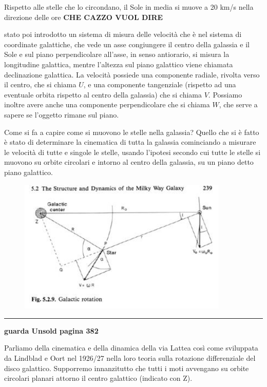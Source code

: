 Rispetto alle stelle che lo circondano, il Sole in media si muove a 20 km/s nella direzione delle ore \textbf{CHE CAZZO VUOL DIRE}

\E stato poi introdotto un sistema di misura delle velocità che è nel sistema di coordinate galattiche, che vede un asse congiungere il centro della galassia e il Sole e sul piano perpendicolare all'asse, in senso antiorario, si misura la longitudine galattica, mentre l'altezza sul piano galattico viene chiamata declinazione galattica. La velocità possiede una componente radiale, rivolta verso il centro, che si chiama $U$, e una componente tangenziale (rispetto ad una eventuale orbita rispetto al centro della galassia) che si chiama $V$. Possiamo inoltre avere anche una componente perpendicolare che si chiama $W$, che serve a sapere se l'oggetto rimane sul piano.

Come si fa a capire come si muovono le stelle nella galassia? Quello che si è fatto è stato di determinare la cinematica di tutta la galassia cominciando a misurare le velocità di tutte e singole le stelle, usando l'ipotesi secondo cui tutte le stelle si muovono su orbite circolari e intorno al centro della galassia, su un piano detto piano galattico.

\begin{figure}[H]
    \centering
    \includegraphics[width=10cm]{Dinamica della via lattea.JPG}
\end{figure}

\rule[7pt]{\linewidth}{0.4pt}

\textbf{guarda Unsold pagina 382}

Parliamo della cinematica e della dinamica della via Lattea così come sviluppata da Lindblad e Oort nel 1926/27 nella loro teoria sulla rotazione differenziale del disco galattico. Supporremo innanzitutto che tutti i moti avvengano su orbite circolari planari attorno il centro galattico (indicato con Z).

